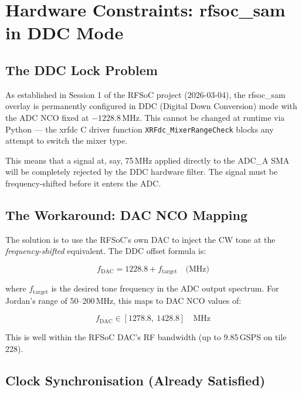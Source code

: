 \documentclass[11pt,a4paper]{article}
\begin{document}
\section{Hardware Constraints: rfsoc\_sam in DDC Mode}

\subsection{The DDC Lock Problem}

As established in Session 1 of the RFSoC project (2026-03-04), the rfsoc\_sam
overlay is permanently configured in DDC (Digital Down Conversion) mode with the
ADC NCO fixed at $-1228.8$\,MHz. This cannot be changed at runtime via Python ---
the xrfdc C driver function \texttt{XRFdc\_MixerRangeCheck} blocks any attempt to
switch the mixer type.

This means that a signal at, say, 75\,MHz applied directly to the ADC\_A SMA
will be completely rejected by the DDC hardware filter. The signal must be
frequency-shifted before it enters the ADC.

\subsection{The Workaround: DAC NCO Mapping}

The solution is to use the RFSoC's own DAC to inject the CW tone at the
\textit{frequency-shifted} equivalent. The DDC offset formula is:

\begin{equation}
  f_{\text{DAC}} = 1228.8 + f_{\text{target}} \quad \text{(MHz)}
  \label{eq:ddc}
\end{equation}

where $f_{\text{target}}$ is the desired tone frequency in the ADC output spectrum.
For Jordan's range of 50--200\,MHz, this maps to DAC NCO values of:

\begin{equation}
  f_{\text{DAC}} \in [1278.8,\ 1428.8] \quad \text{MHz}
\end{equation}

This is well within the RFSoC DAC's RF bandwidth (up to 9.85\,GSPS on tile 228).

\subsection{Clock Synchronisation (Already Satisfied)}
\end{document}
